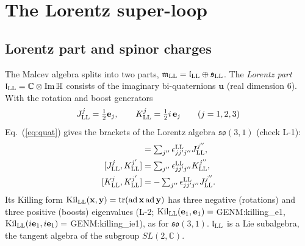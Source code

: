 \section{The Lorentz super-loop}
\label{sec:superloop}

\subsection{Lorentz part and spinor charges}

The Malcev algebra splits into two parts, $\mathfrak m_{\rm LL}=\mathfrak l_{\rm LL}\oplus\mathfrak s_{\rm
LL}$. The \emph{Lorentz part} $\mathfrak l_{\rm LL}=\mathbb C\otimes{\rm Im}\,\mathbb H$ consists of the
imaginary bi-quaternions $\mathbf u$ (real dimension 6). With the rotation and boost generators
\begin{equation}
J^j_{\rm LL}=\tfrac12\mathbf e_j,\qquad K^j_{\rm LL}=\tfrac12 i\,\mathbf e_j\qquad(j=1,2,3)
\label{eq:jk}
\end{equation}
Eq.~(\ref{eq:quat}) gives the brackets of the Lorentz algebra $\mathfrak{so}(3,1)$ (check L-1):
\begin{align}
[J^j_{\rm LL},J^{j'}_{\rm LL}]&=\textstyle\sum_{j''}\epsilon^{\rm LL}_{jj'j''}J^{j''}_{\rm LL},\nonumber\\
[J^j_{\rm LL},K^{j'}_{\rm LL}]&=\textstyle\sum_{j''}\epsilon^{\rm LL}_{jj'j''}K^{j''}_{\rm LL},\label{eq:so31}\\
[K^j_{\rm LL},K^{j'}_{\rm LL}]&=-\textstyle\sum_{j''}\epsilon^{\rm LL}_{jj'j''}J^{j''}_{\rm LL}.\nonumber
\end{align}
Its Killing form $\mathrm{Kil}_{\rm LL}(\mathbf x,\mathbf y)=\mathrm{tr}(\mathrm{ad}\,\mathbf
x\,\mathrm{ad}\,\mathbf y)$ has three negative (rotations) and three positive (boosts) eigenvalues
(L-2; $\mathrm{Kil}_{\rm LL}(\mathbf e_1,\mathbf e_1)={}${{GENM:killing_e1}},
$\mathrm{Kil}_{\rm LL}(i\mathbf e_1,i\mathbf e_1)={}${{GENM:killing_ie1}}), as for $\mathfrak{so}(3,1)$.
$\mathfrak l_{\rm LL}$ is a Lie subalgebra, the tangent algebra of the subgroup $SL(2,\mathbb C)$.

